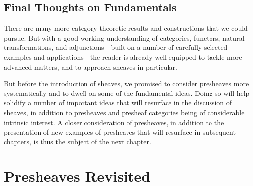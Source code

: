 \documentclass[11pt]{book}
\theoremstyle{definition}
\theoremstyle{definition}
\theoremstyle{definition}
\theoremstyle{theorem}
\theoremstyle{definition}
\begin{document}
\section{Final Thoughts on Fundamentals}
There are many more category-theoretic results and constructions that we could pursue. But with a good working understanding of categories, functors, natural transformations, and adjunctions---built on a number of carefully selected examples and applications---the reader is already well-equipped to tackle more advanced matters, and to approach sheaves in particular. \par   
But before the introduction of sheaves, we promised to consider presheaves more systematically and to dwell on some of the fundamental ideas. Doing so will help solidify a number of important ideas that will resurface in the discussion of sheaves, in addition to presheaves and presheaf categories being of considerable intrinsic interest. A closer consideration of presheaves, in addition to the presentation of new examples of presheaves that will resurface in subsequent chapters, is thus the subject of the next chapter.  
\chapter{Presheaves Revisited} 
\end{document}
